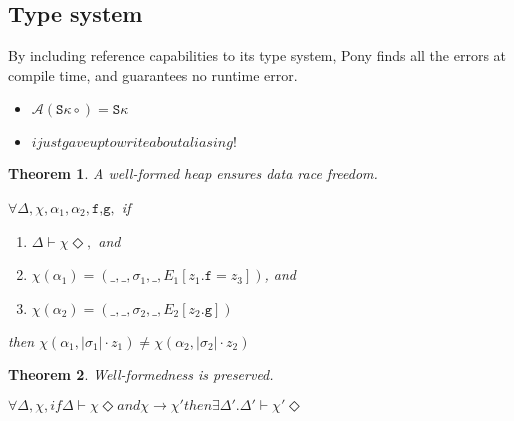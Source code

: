 \documentclass{article}
\begin{document}
\subsection{Type system}
By including reference capabilities to its type system, Pony finds all the errors at compile time, and guarantees no runtime error.

\begin{itemize}
	\item
	 $\mathcal{A}(\texttt{S} \kappa \circ) = \texttt{S} \kappa$
	 
	\item 
	$ 
	i just gave up to write about aliasing!
	$ 
	
\end{itemize}

\begin{prooftree}
\end{prooftree}




\newtheorem{theorem}{Theorem}
\begin{theorem}
	A well-formed heap ensures data race freedom.
	
	$\forall \Delta,\chi,\alpha_1,\alpha_2,\texttt{f,g},$ if
	
	\begin{enumerate}
		\item $\Delta \vdash \chi \Diamond,$ and
		\item $\chi(\alpha_1) = (\_,\_,\sigma_1, \_,  E_1[z_1.\texttt{f} = z_3])$, and
		\item $\chi(\alpha_2) = (\_,\_,\sigma_2, \_,  E_2[z_2.\texttt{g}])$
	\end{enumerate} 
	
	then $\chi(\alpha_1, |\sigma_1|\cdot z_1) \neq \chi(\alpha_2, |\sigma_2| \cdot z_2)$
\end{theorem}

\begin{theorem} 
	Well-formedness is preserved.
	
	$\forall \Delta, \chi, if \Delta \vdash \chi \Diamond and \chi \rightarrow \chi' then  \exists \Delta'.\Delta' \vdash \chi'\Diamond$
\end{theorem}



\end{document}

